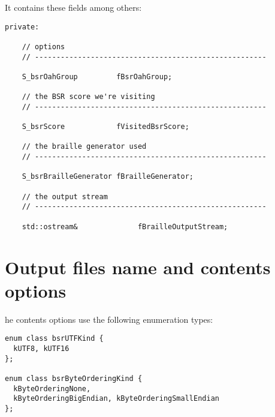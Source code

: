 It contains these fields among others:
\begin{lstlisting}[language=CPlusPlus]
  private:

    // options
    // ------------------------------------------------------

    S_bsrOahGroup         fBsrOahGroup;

    // the BSR score we're visiting
    // ------------------------------------------------------

    S_bsrScore            fVisitedBsrScore;

    // the braille generator used
    // ------------------------------------------------------

    S_bsrBrailleGenerator fBrailleGenerator;

    // the output stream
    // ------------------------------------------------------

    std::ostream&              fBrailleOutputStream;
\end{lstlisting}


\section{Output files name and contents options}

he contents options use the following enumeration types:
\begin{lstlisting}[language=CPlusPlus]
enum class bsrUTFKind {
  kUTF8, kUTF16
};

enum class bsrByteOrderingKind {
  kByteOrderingNone,
  kByteOrderingBigEndian, kByteOrderingSmallEndian
};
\end{lstlisting}

